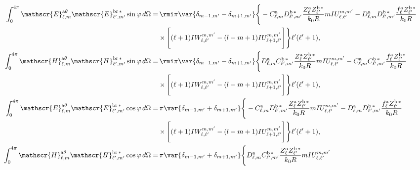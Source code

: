 \begin{align}
\int_{0}^{4\pi} \mathscr{E}_{\ell, m}^{\text{a}\theta}\mathscr{E}_{\ell^{\prime}, m^{\prime}}^{\text{br}\,*} \sin\varphi \, d\Omega =& 
%
\, \rmi \pi \var{ \delta_{m-1, m^{\prime}} - \delta_{m+1, m^{\prime}} } \Bigg\{-C_{\ell,m}^{\rm a}D_{\ell^{\prime}, m^{\prime}}^{\rm b \, *}\frac{Z_{\ell}^{\rm a}Z_{\ell^{\prime}}^{\rm b\, *}}{k_0 R} m IU_{\ell, \ell^{\prime}}^{m, m^{\prime}} 
%
-D_{\ell, m}^{\rm a}D_{\ell^{\prime}, m^{\prime}}^{\rm b \, *} \frac{f_{\ell}^{\rm a}Z_{\ell^{\prime}}^{\rm b \, *}}{k_0 R} \nonumber \\
%
& \times \Bigg[ (\ell+1) IW_{\ell, \ell^{\prime}}^{m, m^{\prime}} 
%
-(l-m+1) IU_{\ell + 1, \ell^{\prime}}^{m, m^{\prime}} \Bigg] \Bigg\}\ell^{\prime}(\ell^{\prime}+1),\\
%
%
\int_{0}^{4\pi} \mathscr{H}_{\ell, m}^{\text{a}\theta}\mathscr{H}_{\ell^{\prime}, m^{\prime}}^{\text{br}\,*} \sin\varphi \, d\Omega =& 
%
\, \rmi \pi \var{ \delta_{m-1, m^{\prime}} - \delta_{m+1, m^{\prime}} } \Bigg\{D_{\ell,m}^{\rm a}C_{\ell^{\prime}, m^{\prime}}^{\rm b \, *}\frac{Z_{\ell}^{\rm a}Z_{\ell^{\prime}}^{\rm b\, *}}{k_0 R} m IU_{\ell, \ell^{\prime}}^{m, m^{\prime}} 
%
-C_{\ell, m}^{\rm a}C_{\ell^{\prime}, m^{\prime}}^{\rm b \, *} \frac{f_{\ell}^{\rm a}Z_{\ell^{\prime}}^{\rm b \, *}}{k_0 R} \nonumber \\
%
& \times \Bigg[ (\ell+1) IW_{\ell, \ell^{\prime}}^{m, m^{\prime}} 
%
-(l-m+1) IU_{\ell + 1, \ell^{\prime}}^{m, m^{\prime}} \Bigg] \Bigg\}\ell^{\prime}(\ell^{\prime}+1),\\
%
%
%
%
\int_{0}^{4\pi} \mathscr{E}_{\ell, m}^{\text{a}\theta}\mathscr{E}_{\ell^{\prime}, m^{\prime}}^{\text{br}\,*} \cos\varphi \, d\Omega =& 
%
\, \pi \var{ \delta_{m-1, m^{\prime}} + \delta_{m+1, m^{\prime}} } \Bigg\{-C_{\ell,m}^{\rm a}D_{\ell^{\prime}, m^{\prime}}^{\rm b \, *}\frac{Z_{\ell}^{\rm a}Z_{\ell^{\prime}}^{\rm b\, *}}{k_0 R} m IU_{\ell, \ell^{\prime}}^{m, m^{\prime}} 
%
-D_{\ell, m}^{\rm a}D_{\ell^{\prime}, m^{\prime}}^{\rm b \, *} \frac{f_{\ell}^{\rm a}Z_{\ell^{\prime}}^{\rm b \, *}}{k_0 R} \nonumber \\
%
& \times \Bigg[ (\ell+1) IW_{\ell, \ell^{\prime}}^{m, m^{\prime}} 
%
-(l-m+1) IU_{\ell + 1, \ell^{\prime}}^{m, m^{\prime}} \Bigg] \Bigg\}\ell^{\prime}(\ell^{\prime}+1),\\
%
%
\int_{0}^{4\pi} \mathscr{H}_{\ell, m}^{\text{a}\theta}\mathscr{H}_{\ell^{\prime}, m^{\prime}}^{\text{br}\,*} \cos\varphi \, d\Omega =& 
%
\, \pi \var{ \delta_{m-1, m^{\prime}} + \delta_{m+1, m^{\prime}} } \Bigg\{D_{\ell,m}^{\rm a}C_{\ell^{\prime}, m^{\prime}}^{\rm b \, *}\frac{Z_{\ell}^{\rm a}Z_{\ell^{\prime}}^{\rm b\, *}}{k_0 R} m IU_{\ell, \ell^{\prime}}^{m, m^{\prime}} 

\end{align}
